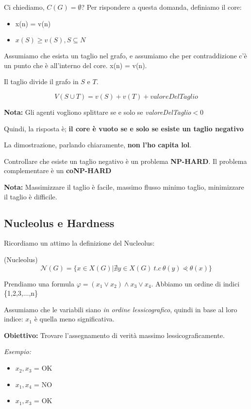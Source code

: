 Ci chiediamo, \textbf{$C(G) = \emptyset$}? Per rispondere a questa domanda,
definiamo il core:
\begin{itemize}
    \item x(n) = v(n)
    \item $x(S) \geq v(S), S \subseteq N$
\end{itemize}
Assumiamo che esista un taglio nel grafo, e assumiamo che per contraddizione c'è un punto che è all'interno del core.
x(n) = v(n).

Il taglio divide il grafo in $S$ e $T$.

\[
    V(S \cup T) = v(S) + v(T) + valoreDelTaglio
\]

\textbf{Nota:} Gli agenti vogliono splittare se e solo se  \textit{valoreDelTaglio}$<$0

Quindi, la risposta è; \textbf{il core è vuoto se e solo se esiste un taglio
    negativo}

La dimostrazione, parlando chiaramente, \textbf{non l'ho capita lol}.

Controllare che esiste un taglio negativo è un problema \textbf{NP-HARD}. Il
problema complementare è un \textbf{coNP-HARD}

\textbf{Nota:} Massimizzare il taglio è facile, massimo flusso minimo taglio, minimizzare il taglio è difficile.

\subsection{Nucleolus e Hardness}

Ricordiamo un attimo la definizione del Nucleolus:

\begin{definition}(Nucleolus)
    \[
        \mathcal{N}(G) = \{x \in X(G) | \nexists y \in X(G) \ t.c \ \theta(y) \curlyeqprec \theta(x)\}
    \]
\end{definition}

Prendiamo una formula $\varphi = (x_1 \lor x_2) \land x_3 \lor x_4$. Abbiamo un
ordine di indici \{1,2,3,$\dots$,n\}

Assumiamo che le variabili siano \textit{in ordine lessicografico}, quindi in
base al loro indice: $x_1$ è quella meno significativa.

\textbf{Obiettivo:} Trovare l'assegnamento di verità massimo lessicograficamente.

\textit{Esempio:}

\begin{itemize}
    \item $x_2, x_3$ = OK
    \item $x_1, x_4$ = NO
    \item $x_1, x_3$ = OK
\end{itemize}

